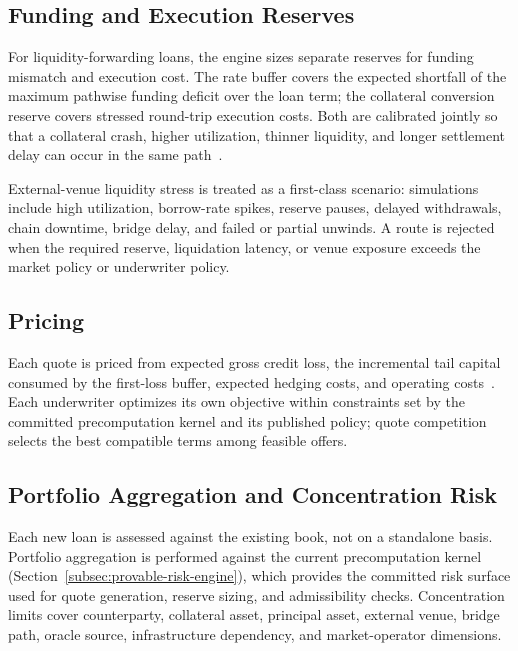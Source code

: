 \subsection{Funding and Execution Reserves}

For liquidity-forwarding loans, the engine sizes separate reserves for funding mismatch and execution cost. The rate buffer covers the expected shortfall of the maximum pathwise funding deficit over the loan term; the collateral conversion reserve covers stressed round-trip execution costs. Both are calibrated jointly so that a collateral crash, higher utilization, thinner liquidity, and longer settlement delay can occur in the same path~\cite{bastankhah2024b,baude2025,chitra2023,nadkarni2025}.

External-venue liquidity stress is treated as a first-class scenario: simulations
include high utilization, borrow-rate spikes, reserve pauses, delayed withdrawals,
chain downtime, bridge delay, and failed or partial unwinds. A route is rejected
when the required reserve, liquidation latency, or venue exposure exceeds the
market policy or underwriter policy.

\subsection{Pricing}

Each quote is priced from expected gross credit loss, the incremental tail capital consumed by the first-loss buffer, expected hedging costs, and operating costs~\cite{baude2025,halpern2024,szpruch2024}. Each underwriter optimizes its own objective within constraints set by the committed precomputation kernel and its published policy; quote competition selects the best compatible terms among feasible offers.

\subsection{Portfolio Aggregation and Concentration Risk}

Each new loan is assessed against the existing book, not on a standalone basis.
Portfolio aggregation is performed against the current precomputation kernel
(Section~\ref{subsec:provable-risk-engine}), which provides the committed risk
surface used for quote generation, reserve sizing, and admissibility checks.
Concentration limits cover counterparty, collateral asset, principal asset,
external venue, bridge path, oracle source, infrastructure dependency, and
market-operator dimensions.

